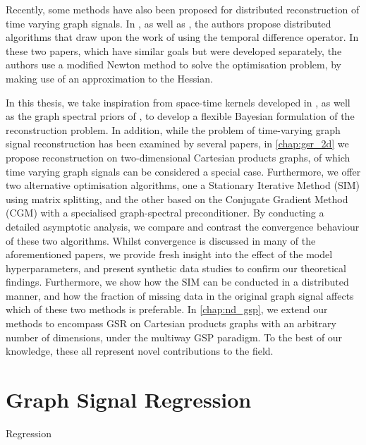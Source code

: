 Recently, some methods have also been proposed for distributed reconstruction of time varying graph signals. In \cite{Chi2022}, as well as \citep{Zhou2022b}, the authors propose distributed algorithms that draw upon the work of \cite{Qiu2017} using the temporal difference operator. In these two papers, which have similar goals but were developed separately, the authors use a modified Newton method to solve the optimisation problem, by making use of an approximation to the Hessian. 

In this thesis, we take inspiration from space-time kernels developed in \cite{Ioannidis2016}, as well as the graph spectral priors of \cite{Venkitaraman2020}, to develop a flexible Bayesian formulation of the reconstruction problem. In addition, while the problem of time-varying graph signal reconstruction has been examined by several papers, in \cref{chap:gsr_2d} we propose reconstruction on two-dimensional Cartesian products graphs, of which time varying graph signals can be considered a special case. Furthermore, we offer two alternative optimisation algorithms, one a Stationary Iterative Method (SIM) using matrix splitting, and the other based on the Conjugate Gradient Method (CGM) with a specialised graph-spectral preconditioner. By conducting a detailed asymptotic analysis, we compare and contrast the convergence behaviour of these two algorithms. Whilst convergence is discussed in many of the aforementioned papers, we provide fresh insight into the effect of the model hyperparameters, and present synthetic data studies to confirm our theoretical findings. Furthermore, we show how the SIM can be conducted in a distributed manner, and how the fraction of missing data in the original graph signal affects which of these two methods is preferable. In \cref{chap:nd_gsp}, we extend our methods to encompass GSR on Cartesian products graphs with an arbitrary number of dimensions, under the multiway GSP paradigm. To the best of our knowledge, these all represent novel contributions to the field. 



\section{Graph Signal Regression}

\cite{Guestrin2004} Regression

\cite{Takeda2007}

\cite{Elias2022}

\cite{Venkitaraman2019}


